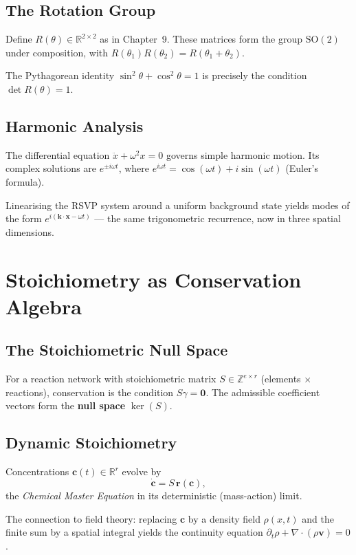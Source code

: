 \documentclass[11pt, openany]{book}
\theoremstyle{plain}
\theoremstyle{definition}
\theoremstyle{remark}
\newcommand{\R}{\mathbb{R}}
\newcommand{\Z}{\mathbb{Z}}
\begin{document}
\section{The Rotation Group}

Define $R(\theta)\in\R^{2\times2}$ as in Chapter~9. These matrices form the
group $\mathrm{SO}(2)$ under composition, with $R(\theta_1)R(\theta_2)=R(\theta_1+\theta_2)$.

The Pythagorean identity $\sin^2\theta+\cos^2\theta=1$ is precisely the
condition $\det R(\theta)=1$.

\section{Harmonic Analysis}

The differential equation $\ddot{x}+\omega^2x=0$ governs simple harmonic
motion. Its complex solutions are $e^{\pm i\omega t}$, where
$e^{i\omega t}=\cos(\omega t)+i\sin(\omega t)$ (Euler's formula).

Linearising the RSVP system around a uniform background state yields modes
of the form $e^{i(\mathbf{k}\cdot\mathbf{x}-\omega t)}$ --- the same
trigonometric recurrence, now in three spatial dimensions.

\chapter{Stoichiometry as Conservation Algebra}

\section{The Stoichiometric Null Space}

For a reaction network with stoichiometric matrix $S\in\Z^{e\times r}$
(elements $\times$ reactions), conservation is the condition
$S\gamma=\mathbf{0}$. The admissible coefficient vectors form the
\textbf{null space} $\ker(S)$.

\section{Dynamic Stoichiometry}

Concentrations $\mathbf{c}(t)\in\R^r$ evolve by
\[
  \dot{\mathbf{c}}=S\,\mathbf{r}(\mathbf{c}),
\]
the \emph{Chemical Master Equation} in its deterministic (mass-action) limit.

The connection to field theory: replacing $\mathbf{c}$ by a density field
$\rho(x,t)$ and the finite sum by a spatial integral yields the continuity
equation $\partial_t\rho+\nabla\cdot(\rho\mathbf{v})=0$.
\end{document}

